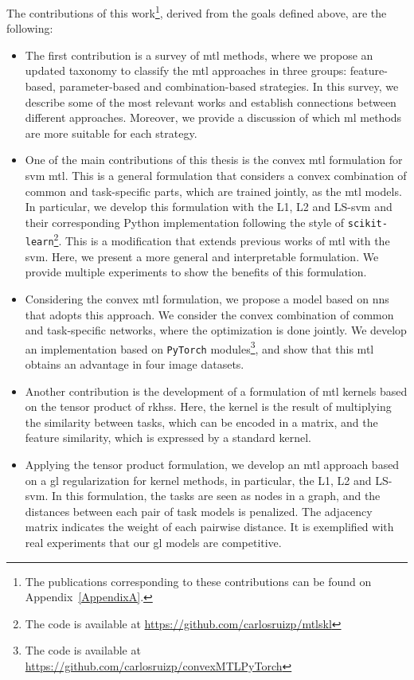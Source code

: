 The contributions of this work\footnote{The publications corresponding to these contributions can be found on Appendix~\ref{AppendixA}.}, derived from the goals defined above, are the following:
\begin{itemize}
    \item The first contribution is a survey of \acrshort{mtl} methods, where we propose an updated taxonomy to classify the \acrshort{mtl} approaches in three groups: feature-based, parameter-based and combination-based strategies. In this survey, we describe some of the most relevant works and establish connections between different approaches. Moreover, we provide a discussion of which \acrshort{ml} methods are more suitable for each strategy.
    \item One of the main contributions of this thesis is the convex \acrshort{mtl} formulation for \acrshort{svm} \acrshort{mtl}. This is a general formulation that considers a convex combination of common and task-specific parts, which are trained jointly, as the \acrshort{mtl} models. In particular, we develop this formulation with the L1, L2 and LS-\acrshort{svm} and their corresponding Python implementation following the style of \texttt{scikit-learn}\footnote{The code is available at \href{https://github.com/carlosruizp/mtlskl}{https://github.com/carlosruizp/mtlskl}}. This is a modification that extends previous works of \acrshort{mtl} with the \acrshort{svm}. Here, we present a more general and interpretable formulation. We provide multiple experiments to show the benefits of this formulation.
    \item Considering the convex \acrshort{mtl} formulation, we propose a model based on \acrshort{nns} that adopts this approach. We consider the convex combination of common and task-specific networks, where the optimization is done jointly. We develop an implementation based on \texttt{PyTorch} modules\footnote{The code is available at \href{https://github.com/carlosruizp/convexMTLPyTorch}{https://github.com/carlosruizp/convexMTLPyTorch}}, and show that this \acrshort{mtl} obtains an advantage in four image datasets.
    \item Another contribution is the development of a formulation of \acrshort{mtl} kernels based on the tensor product of \acrshort{rkhss}. Here, the kernel is the result of multiplying the similarity between tasks, which can be encoded in a matrix, and the feature similarity, which is expressed by a standard kernel.%
    \item Applying the tensor product formulation, we develop an \acrshort{mtl} approach based on a \acrfull{gl} regularization for kernel methods, in particular, the L1, L2 and LS-\acrshort{svm}. In this formulation, the tasks are seen as nodes in a graph, and the distances between each pair of task models is penalized. The adjacency matrix indicates the weight of each pairwise distance. It is exemplified with real experiments that our \acrshort{gl} models are competitive.

\end{itemize}
